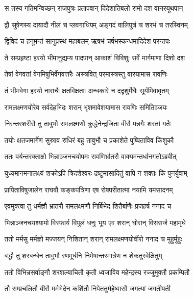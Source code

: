 
\twolineshloka
{स तस्य गतिमन्विच्छन् राजपुत्रः प्रतापवान्}
{दिदेशातिबलो रामो दश वानरयूथपान्} %

\twolineshloka
{द्वौ सुषेणस्य दायादौ नीलं च प्लवगाधिपम्}
{अङ्गदं वालिपुत्रं च शरभं च तरस्विनम्} %

\twolineshloka
{द्विविदं च हनूमन्तं सानुप्रस्थं महाबलम्}
{ऋषभं चर्षभस्कन्धमादिदेश परन्तपः} %

\twolineshloka
{ते सम्प्रहृष्टा हरयो भीमानुद्यम्य पादपान्}
{आकाशं विविशुः सर्वे मार्गमाणा दिशो दश} %

\twolineshloka
{तेषां वेगवतां वेगमिषुभिर्वेगवत्तरैः}
{अस्त्रवित् परमास्त्रस्तु वारयामास रावणिः} %

\twolineshloka
{तं भीमवेगा हरयो नाराचैः क्षतविक्षताः}
{अन्धकारे न ददृशुर्मेघैः सूर्यमिवावृतम्} %

\twolineshloka
{रामलक्ष्मणयोरेव सर्वदेहभिदः शरान्}
{भृशमावेशयामास रावणिः समितिञ्जयः} %

\twolineshloka
{निरन्तरशरीरौ तु तावुभौ रामलक्ष्मणौ}
{क्रुद्धेनेन्द्रजिता वीरौ पन्नगैः शरतां गतैः} %

\twolineshloka
{तयोः क्षतजमार्गेण सुस्राव रुधिरं बहु}
{तावुभौ च प्रकाशेते पुष्पिताविव किंशुकौ} %

\twolineshloka
{ततः पर्यन्तरक्ताक्षो भिन्नाञ्जनचयोपमः}
{रावणिर्भ्रातरौ वाक्यमन्तर्धानगतोऽब्रवीत्} %

\twolineshloka
{युध्यमानमनालक्ष्यं शक्रोऽपि त्रिदशेश्वरः}
{द्रष्टुमासादितुं वापि न शक्तः किं पुनर्युवाम्} %

\twolineshloka
{प्रापिताविषुजालेन राघवौ कङ्कपत्रिणा}
{एष रोषपरीतात्मा नयामि यमसादनम्} %

\twolineshloka
{एवमुक्त्वा तु धर्मज्ञौ भ्रातरौ रामलक्ष्मणौ}
{निर्बिभेद शितैर्बाणैः प्रजहर्ष ननाद च} %

\twolineshloka
{भिन्नाञ्जनचयश्यामो विस्फार्य विपुलं धनुः}
{भूय एव शरान् घोरान् विससर्ज महामृधे} %

\twolineshloka
{ततो मर्मसु मर्मज्ञो मज्जयन् निशितान् शरान्}
{रामलक्ष्मणयोर्वीरो ननाद च मुहुर्मुहुः} %

\twolineshloka
{बद्धौ तु शरबन्धेन तावुभौ रणमूर्धनि}
{निमेषान्तरमात्रेण न शेकतुरवेक्षितुम्} %

\twolineshloka
{ततो विभिन्नसर्वाङ्गौ शरशल्याचितौ कृतौ}
{ध्वजाविव महेन्द्रस्य रज्जुमुक्तौ प्रकम्पितौ} %

\twolineshloka
{तौ सम्प्रचलितौ वीरौ मर्मभेदेन कर्शितौ}
{निपेततुर्महेष्वासौ जगत्यां जगतीपती} %

